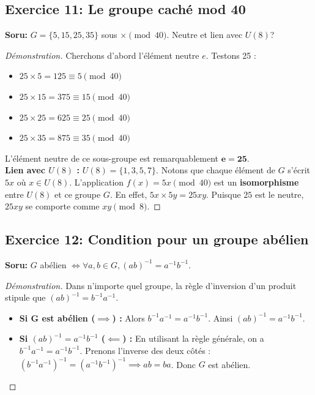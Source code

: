 \documentclass[12pt,a4paper]{report}
\begin{document}
\subsection*{Exercice 11: Le groupe caché mod 40}
\textbf{Soru:} $G = \{5, 15, 25, 35\}$ sous $\times \pmod{40}$. Neutre et lien avec $U(8)$?
\begin{proof}[Démonstration]
Cherchons d'abord l'élément neutre $e$. Testons 25 :
\begin{itemize}
    \item $25 \times 5 = 125 \equiv 5 \pmod{40}$
    \item $25 \times 15 = 375 \equiv 15 \pmod{40}$
    \item $25 \times 25 = 625 \equiv 25 \pmod{40}$
    \item $25 \times 35 = 875 \equiv 35 \pmod{40}$
\end{itemize}
L'élément neutre de ce sous-groupe est remarquablement $\mathbf{e = 25}$.\\
\textbf{Lien avec $U(8)$ :} $U(8) = \{1, 3, 5, 7\}$. Notons que chaque élément de $G$ s'écrit $5x$ où $x \in U(8)$. L'application $f(x) = 5x \pmod{40}$ est un \textbf{isomorphisme} entre $U(8)$ et ce groupe $G$. En effet, $5x \times 5y = 25xy$. Puisque $25$ est le neutre, $25xy$ se comporte comme $xy \pmod 8$.
\end{proof}

\subsection*{Exercice 12: Condition pour un groupe abélien}
\textbf{Soru:} $G$ abélien $\iff \forall a,b \in G, (ab)^{-1} = a^{-1}b^{-1}$.
\begin{proof}[Démonstration]
Dans n'importe quel groupe, la règle d'inversion d'un produit stipule que $(ab)^{-1} = b^{-1}a^{-1}$.
\begin{itemize}
    \item \textbf{Si G est abélien ($\implies$) :} Alors $b^{-1}a^{-1} = a^{-1}b^{-1}$. Ainsi $(ab)^{-1} = a^{-1}b^{-1}$.
    \item \textbf{Si $(ab)^{-1} = a^{-1}b^{-1}$ ($\impliedby$) :} En utilisant la règle générale, on a $b^{-1}a^{-1} = a^{-1}b^{-1}$. Prenons l'inverse des deux côtés : $(b^{-1}a^{-1})^{-1} = (a^{-1}b^{-1})^{-1} \implies ab = ba$. Donc $G$ est abélien.
\end{itemize}
\end{proof}
\end{document}

